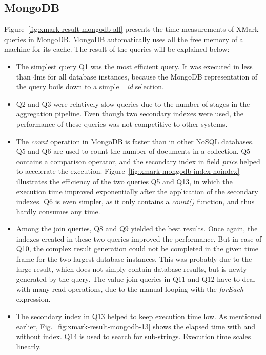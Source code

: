 \subsection{MongoDB}
Figure~\ref{fig:xmark-result-mongodb-all} presents the time measurements of XMark queries in MongoDB. MongoDB automatically uses all the free memory of a machine for its cache. The result of the queries will be explained below:
\begin{itemize}
\item The simplest query Q1 was the most efficient query. It was executed in less than 4ms for all database instances, because the MongoDB representation of the query boils down to a simple \textit{\_id} selection.
\item Q2 and Q3 were relatively slow queries due to the number of stages in the aggregation pipeline. Even though two secondary indexes were used, the performance of these queries was not competitive to other systems. 
\item The \textit{count} operation in MongoDB is faster than in other NoSQL databases. Q5 and Q6 are used to count the number of documents in a collection. Q5 contains a comparison operator, and the secondary index in field \textit{price} helped to accelerate the execution. Figure~\ref{fig:xmark-mongodb-index-noindex} illustrates the efficiency of the two queries Q5 and Q13, in which the execution time improved exponentially after the application of the secondary indexes. Q6 is even simpler, as it only contains a \textit{count()} function, and thus hardly consumes any time.

\item Among the join queries, Q8 and Q9 yielded the best results. Once again, the indexes created in these two queries improved the performance. 
But in case of Q10, the complex result generation could not be completed in the given time frame for the two largest database instances. This was probably due to the large result, which does not simply contain database results, but is newly generated by the query. The value join queries in Q11 and Q12 have to deal with many read operations, due to the manual looping with the \textit{forEach} expression.

\item The secondary index in Q13 helped to keep execution time low. As mentioned earlier, Fig.~\ref{fig:xmark-result-mongodb-13} shows the elapsed time with and without index. Q14 is used to search for sub-strings. Execution time scales linearly.


\end{itemize}
